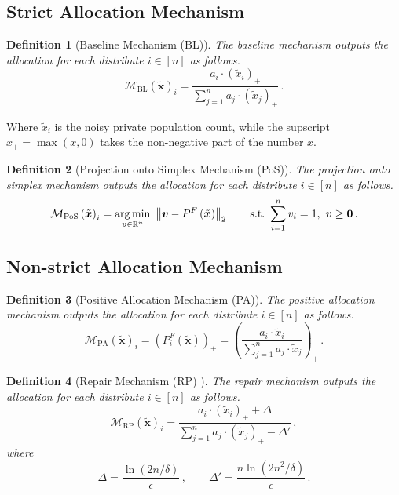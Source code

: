 \documentclass[9pt,twocolumn,twoside,lineno]{pnas-new}
\newtheorem{definition}{Definition}
\newcommand{\cM}{\mathcal{M}}
\newcommand{\noisyalloc}{\alloc{\noisydata}}
\newcommand{\noisydata}{\tilde{\bm{x}}}
\newcommand{\norm}[1]{\left\lVert#1\right\rVert}
\newcommand{\relu}[1]{\left(#1\right)_+}
\newcommand{\alloc}[1]{P^F\left(#1\right)}
\newcommand{\blmech}[1]{\cM_{\mathrm{BL}}\left(#1\right)}
\newcommand{\posmech}[1]{\cM_{\mathrm{PoS}}\left(#1\right)}
\newcommand{\pamech}[1]{\cM_{\mathrm{PA}}\left(#1\right)}
\newcommand{\rpmech}[1]{\cM_{\mathrm{RP}}\left(#1\right)}
\newcommand{\nalloci}[1]{P^F_{#1}\left(\noisydata\right)}
\begin{document}
    \subsection*{Strict Allocation Mechanism}
    
    \begin{definition}[Baseline Mechanism (BL)]
        The \emph{baseline mechanism} outputs the allocation for each distribute $i\in [n]$ as follows.
        \begin{equation*}
            \blmech{\noisydata}_i = \frac{a_i\cdot \relu{\tilde{x}_i}}{\sum_{j=1}^n a_j\cdot \relu{\tilde{x}_j}}\,.
        \end{equation*}
    \end{definition}
    
Where $\tilde{x}_i$ is the noisy private population count, while the supscript $x_{+} = \max(x, 0)$ takes the non-negative part of the number $x$.


    \begin{definition}[Projection onto Simplex Mechanism (PoS)]
        The \emph{projection onto simplex mechanism} outputs the allocation for each distribute $i\in [n]$ as follows.
        \begin{equation*}
            \posmech{\noisydata}_i = \underset{\bm{v}\in\RR^n}{\arg\min}~\norm{\bm{v}-\noisyalloc}_2\qquad\mathrm{s.t.}~
            \sum_{i=1}^n v_i = 1,~\bm{v}\geq \bm{0}\,.
        \end{equation*}
    \end{definition}
    
    \subsection*{Non-strict Allocation Mechanism}
    \begin{definition}[Positive Allocation Mechanism (PA)]
        The \emph{positive allocation mechanism} 
        outputs the allocation for each distribute $i\in [n]$ as follows.
        \begin{equation*}
            \pamech{\noisydata}_i  =  \relu{\nalloci{i}}= \relu{\frac{a_i\cdot \tilde{x}_i}{\sum_{j=1}^n a_j\cdot \tilde{x}_j}}\,.
        \end{equation*}
    \end{definition}
    \begin{definition}[Repair Mechanism (RP) \cite{pujol2020fair}]
        The \emph{repair mechanism} outputs the allocation for each distribute $i\in [n]$ as follows.
        \begin{equation*}
            \rpmech{\noisydata}_i  = \frac{a_i\cdot \relu{\tilde{x}_i}+\Delta}{\sum_{j=1}^n a_j\cdot \relu{\tilde{x}_j} - \Delta'}\,,
        \end{equation*}
        where 
        \begin{equation*}
            \Delta= \frac{\ln\left(2n/\delta\right)}{\epsilon}\,,\qquad\Delta' = 
            \frac{n\ln\left(2n^2/\delta\right)}{\epsilon}\,.
        \end{equation*}
    \end{definition}
    
\end{document}
